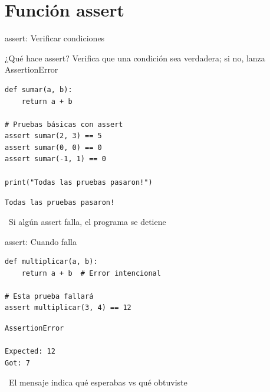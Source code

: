 \documentclass{beamer}
\begin{document}
\section{Función assert}

\begin{frame}[fragile]{assert: Verificar condiciones \faCheckDouble}
\begin{conceptbox}{¿Qué hace assert?}
Verifica que una condición sea verdadera; si no, lanza AssertionError
\end{conceptbox}

\begin{lstlisting}
def sumar(a, b):
    return a + b

# Pruebas básicas con assert
assert sumar(2, 3) == 5
assert sumar(0, 0) == 0
assert sumar(-1, 1) == 0

print("Todas las pruebas pasaron!")
\end{lstlisting}

\vspace{-0.2cm}
\begin{tcolorbox}[colback=green!10,colframe=green,title={\small\faArrowCircleRight \ Salida},coltitle=fg0,left=3pt,right=3pt,top=2pt,bottom=2pt,boxsep=1pt]
\small\texttt{Todas las pruebas pasaron!}
\end{tcolorbox}

\vspace{-0.1cm}
\begin{notebox}
\small\faInfoCircle\ Si algún assert falla, el programa se detiene
\end{notebox}
\end{frame}

\begin{frame}[fragile]{assert: Cuando falla \faExclamationTriangle}
\begin{lstlisting}
def multiplicar(a, b):
    return a + b  # Error intencional

# Esta prueba fallará
assert multiplicar(3, 4) == 12
\end{lstlisting}

\vspace{-0.2cm}
\begin{tcolorbox}[colback=red!10,colframe=red,title={\small\faExclamationTriangle \ Error},coltitle=fg0,left=3pt,right=3pt,top=2pt,bottom=2pt,boxsep=1pt]
\small\texttt{AssertionError\\
\ \\
Expected: 12\\
Got: 7}
\end{tcolorbox}

\vspace{-0.1cm}
\begin{notebox}
\small\faLightbulb\ El mensaje indica qué esperabas vs qué obtuviste
\end{notebox}
\end{frame}
\end{document}
